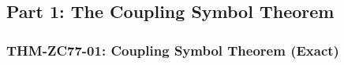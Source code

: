 \documentclass[12pt, a4paper]{article}
\begin{document}
\newpage

\subsection{Part 1: The Coupling Symbol Theorem}
\label{sec:coupling}

\subsubsection{THM-ZC77-01: Coupling Symbol Theorem (Exact)}
\label{sec:thm01}

\end{document}
